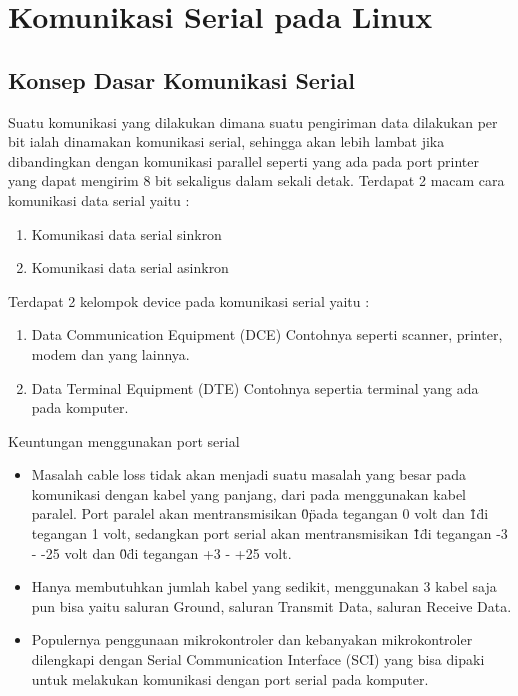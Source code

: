 
\section{Komunikasi Serial pada Linux}
	
	\subsection{Konsep Dasar Komunikasi Serial}
	Suatu komunikasi yang dilakukan dimana suatu pengiriman data dilakukan per bit ialah dinamakan komunikasi serial, sehingga akan lebih lambat jika dibandingkan dengan komunikasi parallel seperti yang ada pada port printer yang dapat mengirim 8 bit sekaligus dalam sekali detak.
	Terdapat 2 macam cara komunikasi data serial yaitu :
		\begin{enumerate}
			\item Komunikasi data serial sinkron
			\item Komunikasi data serial asinkron
		\end{enumerate}
	
	Terdapat 2 kelompok device pada komunikasi serial yaitu :
		\begin{enumerate}
			\item Data Communication Equipment (DCE)
			Contohnya seperti scanner, printer, modem dan yang lainnya.
			\item Data Terminal Equipment (DTE)
			Contohnya sepertia terminal yang ada pada komputer.
		\end{enumerate}
	
	Keuntungan menggunakan port serial
		\begin{itemize}
			\item Masalah cable loss tidak akan menjadi suatu masalah yang besar pada komunikasi dengan kabel yang panjang, dari pada menggunakan kabel paralel. Port paralel akan mentransmisikan \"0\" pada tegangan 0 volt dan \"1\" di tegangan 1 volt, sedangkan port serial akan mentransmisikan \"1\" di tegangan -3 - -25 volt dan \"0\" di tegangan +3 - +25 volt.
			\item Hanya membutuhkan jumlah kabel yang sedikit, menggunakan 3 kabel saja pun bisa yaitu saluran Ground, saluran Transmit Data, saluran Receive Data.
			\item Populernya penggunaan mikrokontroler dan kebanyakan mikrokontroler dilengkapi dengan Serial Communication Interface (SCI) yang bisa dipaki untuk melakukan komunikasi dengan port serial pada komputer.
		\end{itemize}

